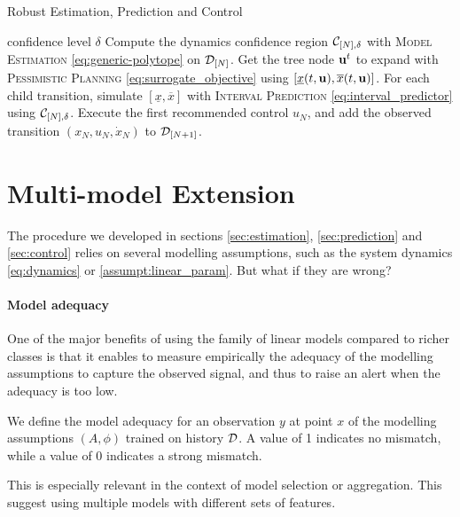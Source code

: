 \documentclass{article}
\begin{document}
\begin{algorithm}[tb]
   \caption{Robust Estimation, Prediction and Control}
   \label{alg:full}
\begin{algorithmic}
    confidence level $\delta$
   \STATE Compute the dynamics confidence region $\mathcal{C}_{[N],\delta}$ with \textsc{Model Estimation} \eqref{eq:generic-polytope} on $\mathcal{D}_{[N]}$.
   \STATE Get the tree node $\mathbf{u}^t$ to expand with \textsc{Pessimistic Planning}  \eqref{eq:surrogate_objective} using $[\underline{x}(t,\mathbf{u}), \overline{x}(t,\mathbf{u})]$.
   \STATE For each child transition, simulate $[\underline{x}, \overline{x}]$ with \textsc{Interval Prediction} \eqref{eq:interval_predictor} using $\mathcal{C}_{[N],\delta}$.
   \ENDFOR
   \STATE Execute the first recommended control $u_N$, and add the observed transition $(x_N, u_N, \dot{x}_N)$ to $\mathcal{D}_{[N+1]}$.
   \ENDFOR
   
\end{algorithmic}
\end{algorithm}

\section{Multi-model Extension}

The procedure we developed in sections \ref{sec:estimation}, \ref{sec:prediction} and \ref{sec:control} relies on several modelling assumptions, such as the system dynamics \eqref{eq:dynamics} or \autoref{assumpt:linear_param}. But what if they are wrong?

\paragraph{Model adequacy}

One of the major benefits of using the family of linear models compared to richer classes is that it enables to measure empirically the adequacy of the modelling assumptions to capture the observed signal,  and thus to raise an alert when the adequacy is too low. 

We define the model adequacy for an observation $y$ at point $x$ of the modelling assumptions $(A, \phi)$ trained on history $\mathcal{D}$.
A value of 1 indicates no mismatch, while a value of 0 indicates a strong mismatch.

This is especially relevant in the context of model selection or aggregation.
This suggest using multiple models with different sets of features.
\end{document}
